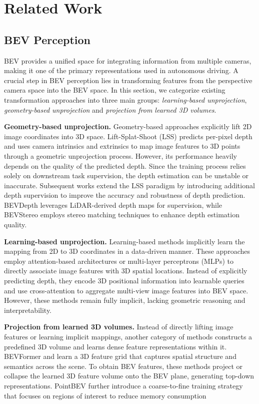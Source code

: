 \section{Related Work}
\label{sec:related_work}
\subsection{BEV Perception}
BEV provides a unified space for integrating information from multiple cameras, making it one of the primary representations used in autonomous driving.
A crucial step in BEV perception lies in transforming features from the perspective camera space into the BEV space.
In this section, we categorize existing transformation approaches into three main groups: \textit{learning-based unprojection}, \textit{geometry-based unprojection} and \textit{projection from learned 3D volumes}.

\noindent\textbf{Geometry-based unprojection.}
Geometry-based approaches explicitly lift 2D image coordinates into 3D space.
Lift-Splat-Shoot (LSS) \cite{philion2020lift} predicts per-pixel depth and uses camera intrinsics and extrinsics to map image features to 3D points through a geometric unprojection process.
However, its performance heavily depends on the quality of the predicted depth.
Since the training process relies solely on downstream task supervision, the depth estimation can be unstable or inaccurate.
Subsequent works \cite{li2023bevstereo, li2023bevdepth, xie2022m, yang2023parametric} extend the LSS paradigm by introducing additional depth supervision to improve the accuracy and robustness of depth prediction.
BEVDepth \cite{li2023bevdepth} leverages LiDAR-derived depth maps for supervision, while BEVStereo \cite{li2023bevstereo} employs stereo matching techniques to enhance depth estimation quality.

\noindent\textbf{Learning-based unprojection.}
Learning-based methods \cite{liu2022petr, liu2023petrv2, pan2023baeformer, zhou2022cross, bartoccioni2023lara} implicitly learn the mapping from 2D to 3D coordinates in a data-driven manner. 
These approaches employ attention-based architectures or multi-layer perceptrons (MLPs) to directly associate image features with 3D spatial locations.
Instead of explicitly predicting depth, they encode 3D positional information into learnable queries and use cross-attention to aggregate multi-view image features into BEV space.
However, these methods remain fully implicit, lacking geometric reasoning and interpretability.

\noindent\textbf{Projection from learned 3D volumes.}
Instead of directly lifting image features or learning implicit mappings, another category of methods constructs a predefined 3D volume and learns dense feature representations within it.
BEVFormer \cite{li2024bevformer} and \cite{harley2023simple} learn a 3D feature grid that captures spatial structure and semantics across the scene.
To obtain BEV features, these methods project or collapse the learned 3D feature volume onto the BEV plane, generating top-down representations.
PointBEV \cite{chambon2024pointbev} further introduce a coarse-to-fine training strategy that focuses on regions of interest to reduce memory consumption


